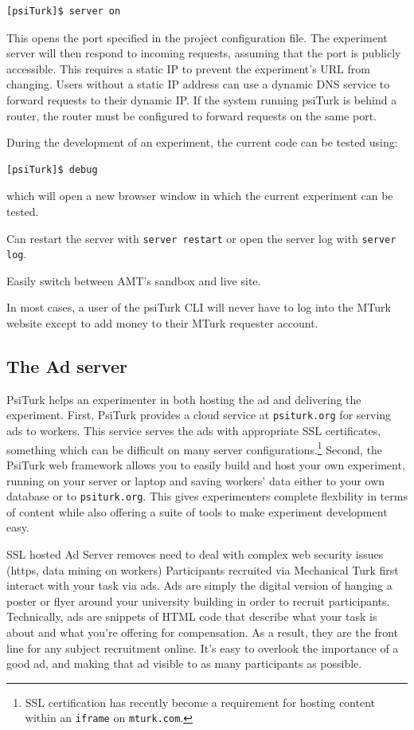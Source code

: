 \documentclass[twocolumn]{svjour3}          %
\begin{document}
\begin{lstlisting}
[psiTurk]$ server on
\end{lstlisting}

\noindent This opens the port specified in the project configuration file.
The experiment server will then respond to incoming requests, assuming that the port is publicly accessible.
This requires a static IP to prevent the experiment's URL from changing.
Users without a static IP address can use a dynamic DNS service to forward requests to their dynamic IP.
If the system running psiTurk is behind a router, the router must be configured to forward requests on the same port.

During the development of an experiment, the current code can be tested using:

\begin{lstlisting}
[psiTurk]$ debug
\end{lstlisting}

\noindent which will open a new browser window in which the current experiment can be tested.

Can restart the server with \texttt{server restart} or open the server log with \texttt{server log}. 

Easily switch between AMT's sandbox and live site.

In most cases, a user of the
psiTurk CLI will never have to log into the MTurk website except to add money to their MTurk
requester account.


\subsection{The Ad server}

PsiTurk helps an experimenter in both hosting the ad and delivering the experiment.
First, PsiTurk provides a cloud service at \texttt{psiturk.org} for serving ads to workers.
This service serves the ads with appropriate SSL certificates, something which can be difficult on many server configurations.\footnote{SSL certification has recently become a requirement for hosting content within an \texttt{iframe} on \texttt{mturk.com}.}
Second, the PsiTurk web framework allows you to easily build and host your own experiment, running on your server or laptop and saving workers' data either to your own database  or to \texttt{psiturk.org}.
This gives experimenters complete flexbility in terms of content while also offering a suite of tools to make experiment development easy.

SSL hosted Ad Server removes need to deal with complex web security issues (https, data mining on workers) 
Participants recruited via Mechanical Turk first interact with your task via ads. Ads are simply the digital version of hanging a poster or flyer around your university building in order to recruit participants. Technically, ads are snippets of HTML code that describe what your task is about and what you're offering for compensation. As a result, they are the front line for any subject recruitment online. It's easy to overlook the importance of a good ad, and making that ad visible to as many participants as possible.
\end{document}
